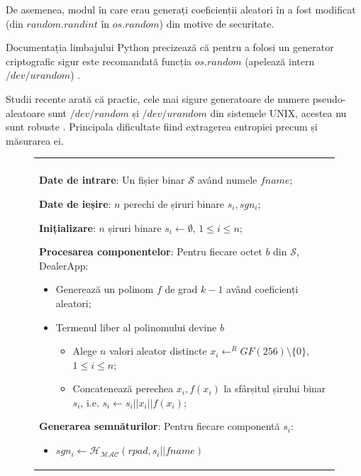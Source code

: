\documentclass[oneside, 12pt]{book}
\begin{document}
De asemenea, modul în care erau generați coeficienții aleatori în \cite{website:pysss-github} a fost modificat (din $random.randint$ în $os.random$) din motive de securitate.

Documentația limbajului Python precizează că pentru a folosi un generator criptografic sigur este recomandată funcția $os.random$ (apelează intern $/dev/urandom$) \cite{website:python-random}.

Studii recente arată că practic, cele mai sigure generatoare de numere pseudo-aleatoare sunt $/dev/random$ și $/dev/urandom$ din sistemele UNIX, acestea nu sunt robuste \cite{dodis2013security}. Principala dificultate fiind extragerea entropiei precum și măsurarea ei.

\begin{figure}[h!]

\begin{tabular}{|p{\textwidth}|}
\hline

\\
\hspace{.1in}
\textbf{Date de intrare}: Un fișier binar $\mathcal{S}$ având numele $fname$;
\medskip

\hspace{.1in}
\textbf{Date de ieșire}: $n$ perechi de șiruri binare $s_i, sgn_i$;
\medskip

\hspace{.1in}
\textbf{Inițializare}: $n$ șiruri binare $s_i \leftarrow \emptyset$, $1 \leq i \leq n$;
\medskip

\hspace{.1in}
\textbf{Procesarea componentelor}: Pentru fiecare octet $b$ din $\mathcal{S}$, DealerApp:
	\begin{itemize}
		\item Generează un polinom $f$ de grad $k - 1$ având coeficienți aleatori;
		\item Termenul liber al polinomului devine $b$
		\begin{itemize}
			\item Alege $n$ valori aleator distincte $x_i \leftarrow^R GF(256) \setminus \{0\}$, $1 \leq i \leq n$;
			\item Concatenează perechea $x_i, f(x_i)$ la sfârșitul șirului binar $s_i$, i.e. $s_i \leftarrow s_i || x_i || f(x_i)$;
		\end{itemize}
	\end{itemize}
\medskip

\hspace{.1in}
\medskip
\textbf{Generarea semnăturilor}: Pentru fiecare componentă $s_i$:
	\begin{itemize}
		\item $sgn_i \leftarrow \mathcal{H_{MAC}}(rpad, s_i || fname)$
	\end{itemize}


\end{tabular}
\end{figure}
\end{document}
